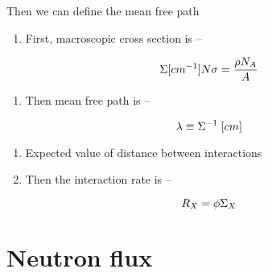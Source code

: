 \documentclass[aspectratio=1610,pdftex,dvipsnames,compress,xcolor={dvipsnames}]{beamer}
\begin{document}
\begin{frame}{Then we can define the mean free path}
    \begin{enumerate}[series=outerlist,topsep=0pt,itemsep=21pt,leftmargin=*,label=(\arabic*)]
        \item[]First, macroscopic cross section is --
    \end{enumerate}

    \vspace*{\fill}

    \begin{equation}
        \LARGE
        \Sigma [cm^{-1}] N \sigma = \frac{\rho N_A}{A}
    \end{equation}

    \vspace*{\fill}

    \begin{enumerate}[series=outerlist,topsep=0pt,itemsep=21pt,leftmargin=*,label=(\arabic*)]
        \item[]Then mean free path is --
    \end{enumerate}

    \vspace*{\fill}

    \begin{equation}
        \LARGE
        \lambda \equiv \Sigma^{-1} \; [cm]
    \end{equation}

    \vspace*{\fill}

    \begin{enumerate}[series=outerlist,topsep=0pt,itemsep=11pt,leftmargin=*,label=(\arabic*)]
        \item[]Expected value of distance between interactions
        \item[]Then the interaction rate is --
    \end{enumerate}

    \vspace*{\fill}

    \begin{equation}
        \LARGE
        R_X = \phi \Sigma_X
    \end{equation}

\end{frame}


\section{Neutron flux}
\end{document}
